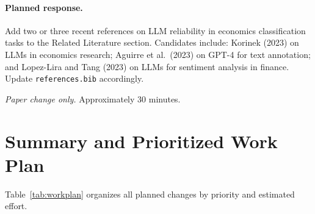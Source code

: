 \documentclass[12pt]{article}
\begin{document}
\paragraph{Planned response.}
Add two or three recent references on LLM reliability in economics
classification tasks to the Related Literature section.  Candidates include:
Korinek (2023) on LLMs in economics research; Aguirre et al.\ (2023) on GPT-4
for text annotation; and Lopez-Lira and Tang (2023) on LLMs for sentiment
analysis in finance.  Update \texttt{references.bib} accordingly.

\textit{Paper change only.}  Approximately 30 minutes.

\section{Summary and Prioritized Work Plan}

Table~\ref{tab:workplan} organizes all planned changes by priority and
estimated effort.
\end{document}
